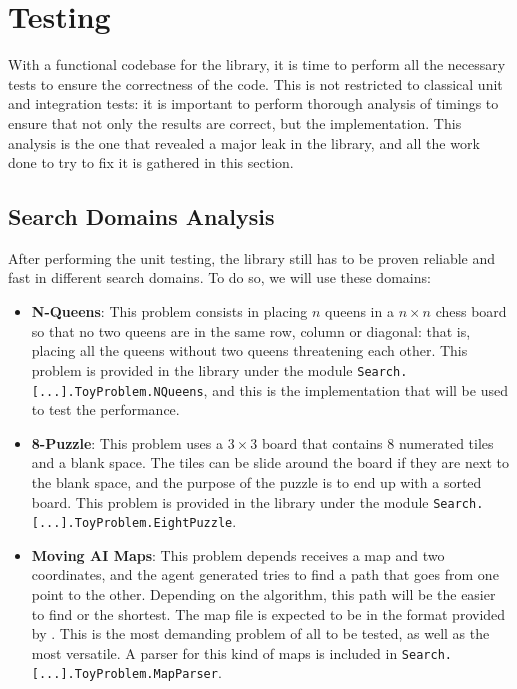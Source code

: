 \section{Testing}

With a functional codebase for the library, it is time to perform all the
necessary tests to ensure the correctness of the code. This is not restricted
to classical unit and integration tests: it is important to perform thorough
analysis of timings to ensure that not only the results are correct, but the
implementation. This analysis is the one that revealed a major leak in the
library, and all the work done to try to fix it is gathered in this section.\\

\subsection{Search Domains Analysis}

After performing the unit testing, the library still has to be proven reliable
and fast in different search domains. To do so, we will use these domains:

\begin{itemize}
\item \textbf{N-Queens}: This problem consists in placing $n$ queens in a $n
  \times n$ chess board so that no two queens are in the same row, column or
  diagonal: that is, placing all the queens without two queens threatening each
  other. This problem is provided in the library under the module
  \texttt{Search.[...].ToyProblem.NQueens}, and this is the implementation that will
  be used to test the performance.
\item \textbf{8-Puzzle}: This problem uses a $3 \times 3$ board that contains 8
  numerated tiles and a blank space. The tiles can be slide around the board if
  they are next to the blank space, and the purpose of the puzzle is to end up
  with a sorted board. This problem is provided in the library under the module
  \texttt{Search.[...].ToyProblem.EightPuzzle}.
\item \textbf{Moving AI Maps}: This problem depends receives a map and two
  coordinates, and the agent generated tries to find a path that goes from one
  point to the other. Depending on the algorithm, this path will be the easier
  to find or the shortest. The map file is expected to be in the format
  provided by \cite{movingai-benchmarks}. This is the most demanding problem of
  all to be tested, as well as the most versatile. A parser for this kind of
  maps is included in \texttt{Search.[...].ToyProblem.MapParser}.
\end{itemize}

